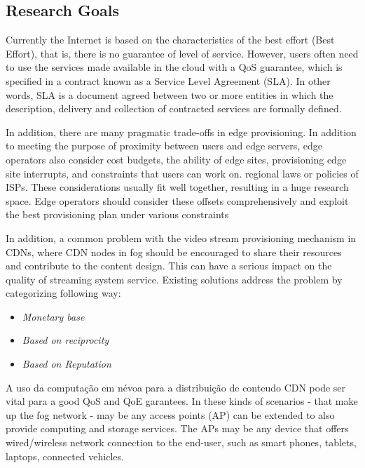 
\subsection*{Research Goals}
\label{sec:research-goals}

Currently the Internet is based on the characteristics of the best effort (Best Effort), that is, there is no guarantee of level of service. However, users often need to use the services made available in the cloud with a QoS guarantee, which is specified in a contract known as a Service Level Agreement (SLA). In other words, SLA is a document agreed between two or more entities in which the description, delivery and collection of contracted services are formally defined.

In addition, there are many pragmatic trade-offs in edge provisioning. In addition to meeting the purpose of proximity between users and edge servers, edge operators also consider cost budgets, the ability of edge sites, provisioning edge site interrupts, and constraints that users can work on. regional laws or policies of ISPs. These considerations usually fit well together, resulting in a huge research space. Edge operators should consider these offsets comprehensively and exploit the best provisioning plan under various constraints

In addition, a common problem with the video stream provisioning mechanism in CDNs, where CDN nodes in fog should be encouraged to share their resources and contribute to the content design. This can have a serious impact on the quality of streaming system service. Existing solutions address the problem by categorizing following way:

\begin{itemize}

	\item \textit{Monetary base}
	\item \textit{Based on reciprocity}
	\item \textit{Based on Reputation}
	
\end{itemize}

 A uso da computação em névoa para a distribuição de conteudo CDN pode ser vital para a good QoS and QoE garantees. In these kinds of scenarios - that make up the fog network - may be any access points (AP) can be extended to also provide computing and storage services. The APs may be any device that offers wired/wireless network connection to the end-user, such as smart phones, tablets, laptops, connected vehicles.%

